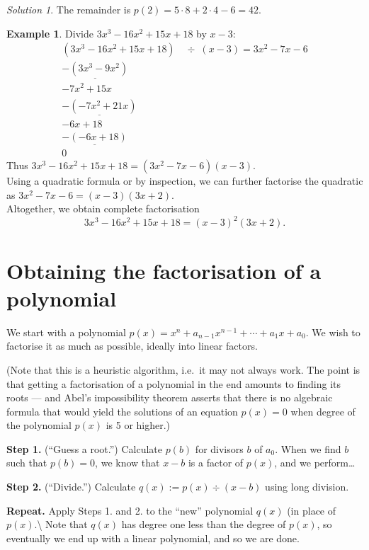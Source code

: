 \documentclass[
  12pt,
  oneside]{book}
\theoremstyle{definition}
\theoremstyle{definition}
\newtheorem{example}{Example}[chapter]
\theoremstyle{definition}
\theoremstyle{definition}
\theoremstyle{remark}
\newtheorem*{solution}{Solution}
\begin{document}
\begin{solution}
The remainder is \(p(2) = 5\cdot8+2\cdot4-6=42\).
\end{solution}

\begin{example}
Divide \(3x^3-16x^2+15x+18\) by \(x-3\):
\[
\begin{array}{rl}
(3x^3-16x^2+15x+18) &\div \,\,\,(x-3) = 3x^2-7x-6\\
\underline{-(3x^3-9x^2)}\phantom{+15x+18x}\\
-7x^2 + 15x\phantom{+18x)}\\
\underline{-(-7x^2+21x)}\phantom{+18o}\\
-6x+18\phantom{x}\\
\underline{-(-6x+18)}\\
0\phantom{x}
\end{array}
\]
Thus \(3x^3-16x^2+15x+18 = (3x^2-7x-6)(x-3)\).\\
Using a quadratic formula or by inspection, we can further factorise the quadratic as \(3x^2-7x-6 = (x-3)(3x+2)\).\\
Altogether, we obtain complete factorisation
\[3x^3-16x^2+15x+18=(x-3)^2(3x+2).\]
\end{example}

\section{Obtaining the factorisation of a polynomial}\label{obtaining-the-factorisation-of-a-polynomial}

We start with a polynomial \(p(x)=x^n+a_{n-1}x^{n-1}+\cdots+a_1x+a_0\). We wish to factorise it as much as possible, ideally into linear factors.

(Note that this is a heuristic algorithm, i.e.~it may not always work. The
point is that getting a factorisation of a polynomial in the end amounts to
finding its roots --- and Abel's impossibility theorem asserts that there is no
algebraic formula that would yield the solutions of an equation \(p(x)=0\) when
degree of the polynomial \(p(x)\) is 5 or higher.)

\textbf{Step 1.} (``Guess a root.'') Calculate \(p(b)\) for divisors \(b\) of \(a_0\). When we find \(b\) such that \(p(b)=0\), we know that \(x-b\) is a factor of \(p(x)\), and we perform\dots

\textbf{Step 2.} (``Divide.'') Calculate \(q(x) := p(x)\div(x-b)\) using long division.

\textbf{Repeat.} Apply Steps 1. and 2. to the ``new'' polynomial \(q(x)\) (in place of \(p(x)\).\textbackslash{}
Note that \(q(x)\) has degree one less than the degree of \(p(x)\), so eventually
we end up with a linear polynomial, and so we are done.
\end{document}
